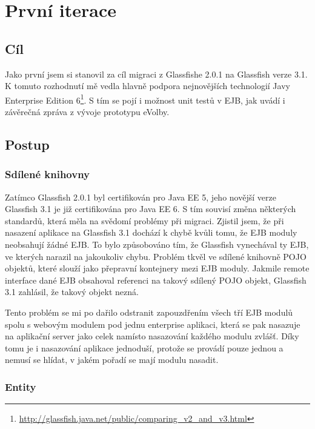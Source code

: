 \documentclass[11pt,twoside,a4paper]{book}
\begin{document}
\section{První iterace} \label{sec:iterace:prvni}

\subsection{Cíl}

Jako první jsem si stanovil za cíl migraci z Glassfishe 2.0.1 na Glassfish verze 3.1. K tomuto rozhodnutí mě vedla hlavně podpora nejnovějších technologií Javy Enterprise Edition 6\footnote{\url{http://glassfish.java.net/public/comparing_v2_and_v3.html}}. S tím se pojí i možnost unit testů v EJB, jak uvádí i závěrečná zpráva z vývoje prototypu eVolby\cite{www:prototyp}.

\subsection{Postup}

\subsubsection{Sdílené knihovny}

Zatímco Glassfish 2.0.1 byl certifikován pro Java EE 5, jeho novější verze Glassfish 3.1 je již certifikována pro Java EE 6. S tím souvisí změna některých standardů, která měla na svědomí problémy při migraci. Zjistil jsem, že při nasazení aplikace na Glassfish 3.1 dochází k chybě kvůli tomu, že EJB moduly neobsahují žádné EJB. To bylo způsobováno tím, že Glassfish vynechával ty EJB, ve kterých narazil na jakoukoliv chybu. Problém tkvěl ve sdílené knihovně POJO objektů, které slouží jako přepravní kontejnery mezi EJB moduly. Jakmile remote interface dané EJB obsahoval referenci na takový sdílený POJO objekt, Glassfish 3.1 zahlásil, že takový objekt nezná.

Tento problém se mi po dařilo odstranit zapouzdřením všech tří EJB modulů spolu s webovým modulem pod jednu enterprise aplikaci, která se pak nasazuje na aplikační server jako celek namísto nasazování každého modulu zvlášť. Díky tomu je i nasazování aplikace jednoduší, protože se provádí pouze jednou a nemusí se hlídat, v jakém pořadí se mají modulu nasadit.

\subsubsection{Entity}
\end{document}
